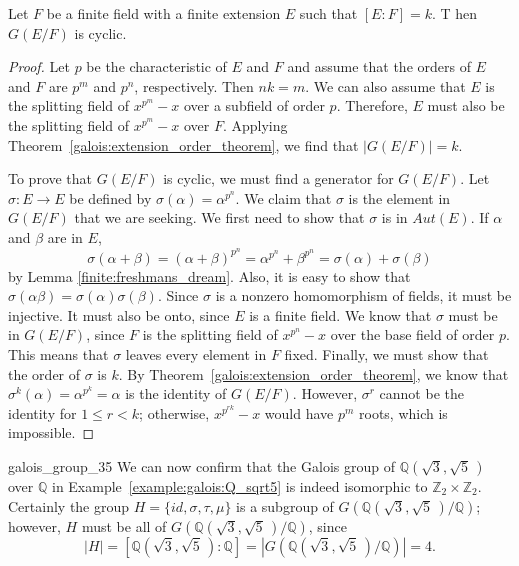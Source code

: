 \begin{corollary}
Let $F$ be a finite field with a finite extension $E$ such that $[E:F]=k$. T hen $G(E/F)$ is cyclic.
\end{corollary}

\begin{proof}
Let $p$ be the characteristic of $E$ and $F$ and assume that the orders of $E$ and $F$ are $p^m$ and $p^n$, respectively.  Then $nk = m$.  We can also assume that $E$ is the splitting field of $x^{p^m} - x$
over a subfield of order $p$.  Therefore, $E$ must also be the splitting field of $x^{p^m} - x$ over $F$.  Applying Theorem~\ref{galois:extension_order_theorem}, we find that $|G(E/F)| = k$.     

To prove that $G(E/F)$ is cyclic, we must find a generator for $G(E/F)$.  Let $\sigma : E \rightarrow E$ be defined by $\sigma(\alpha) = \alpha^{p^n}$.  We claim that $\sigma$ is the element in $G(E/F)$ that
we are seeking.  We first need to show that $\sigma$ is in $Aut(E)$.  If $\alpha$ and $\beta$ are in $E$,   
\[
\sigma(\alpha + \beta) = (\alpha + \beta)^{p^n}
= \alpha^{p^n} + \beta^{p^n} = \sigma(\alpha) + \sigma(\beta)
\]
by Lemma \ref{finite:freshmans_dream}.  Also, it is easy to show that $\sigma(\alpha \beta) = \sigma( \alpha ) \sigma( \beta )$. Since $\sigma$ is a nonzero homomorphism of fields, it must be injective.  It must also be onto, since $E$ is a finite field.  We know that $\sigma$ must be in $G(E/F)$, since $F$ is the splitting field of $x^{p^n} - x$ over the base field of order $p$. This means that $\sigma$ leaves every element in $F$ fixed.  Finally, we must show that the order of $\sigma$ is $k$. By Theorem~\ref{galois:extension_order_theorem}, we know that $\sigma^k( \alpha ) = \alpha^{p^k} = \alpha$ is the identity of $G( E/F)$.  However, $\sigma^r$ cannot be the identity for $1 \leq r < k$; otherwise, $x^{p^{rk}} - x$ would have $p^m$ roots, which is impossible. 
\end{proof}
 

\begin{example}{galois_group_35}
We can now confirm that the Galois group of ${\mathbb Q}( \sqrt{3},
\sqrt{5}\, )$ over ${\mathbb Q}$ in Example~\ref{example:galois:Q_sqrt5} is indeed isomorphic to
${\mathbb Z}_2 \times {\mathbb Z}_2$.  Certainly the group $H = \{ id,
\sigma, \tau, \mu \}$ is a subgroup of $G({\mathbb Q}( \sqrt{3}, \sqrt{5}\,
)/{\mathbb Q})$; however,  $H$ must be all of $G({\mathbb Q}( \sqrt{3},
\sqrt{5}\, )/{\mathbb Q})$, since  
\[
|H| = [{\mathbb Q}( \sqrt{3}, \sqrt{5}\, ):{\mathbb Q}] = |G({\mathbb Q}(
\sqrt{3}, \sqrt{5}\, )/{\mathbb Q})| = 4.
\]
\end{example}
 

